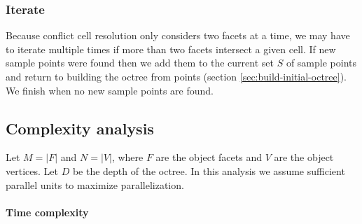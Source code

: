 \documentclass[submission]{gmp2017}
\begin{document}
\subsubsection{Iterate}

Because conflict cell resolution only considers two facets at a time, we may have to iterate multiple times if more than two facets intersect a given cell. If new sample points were found then we add them to the current set $S$ of sample points and return to building the octree from points (section \ref{sec:build-initial-octree}). We finish when no new sample points are found.

\subsection{Complexity analysis}

Let $M = |F|$ and $N = |V|$, where $F$ are the object facets and $V$ are the object vertices. Let $D$ be the depth of the octree. In this analysis we assume sufficient parallel units to maximize parallelization.

\vspace{2mm}
\paragraph{Time complexity}
\end{document}
